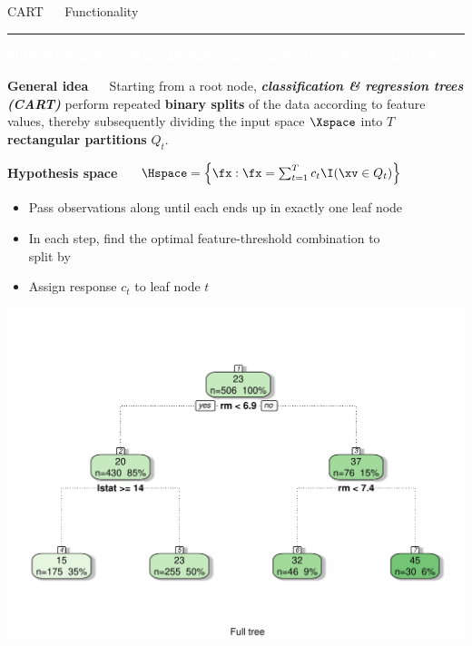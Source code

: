 \documentclass[11pt,compress,t,notes=noshow, xcolor=table]{beamer}
\begin{document}

\LARGE
\begin{frame}{\textcolor{gray!80}{CART} ~~ Functionality}
\normalsize
\vspace{-0.5cm}
\noindent \textcolor{gray!80}{\rule{\textwidth}{1pt}}

\vspace{0.3cm}

\footnotesize

\colorbox{gray!80}{\textcolor{white}{SUPERVISED}} 
\colorbox{gray!80}{\textcolor{white}{NON-PARAMETRIC}} 
\colorbox{gray!80}{\textcolor{white}{WHITE-BOX}} 
\colorbox{gray!80}{\textcolor{white}{FEATURE SELECTION}}

\medskip

\textbf{\textcolor{gray!80}{General idea}} ~~ Starting from a root node, 
\textit{\textbf{classification \& regression trees (CART)}} 
perform repeated \textbf{binary splits} of the data according to feature values, 
thereby subsequently dividing the input space $\Xspace$ into $T$ 
\textbf{rectangular partitions} $Q_t$.

\medskip
 
\textbf{\textcolor{gray!80}{Hypothesis space}} ~~
$\Hspace = \left\{ \fx: \fx = \sum_{t = 1}^T c_t \I(\xv \in Q_t) 
\right\}$

\medskip

\begin{minipage}{0.5\textwidth}
  \begin{itemize}
    \item Pass observations along until each ends up in exactly 
    one leaf node
    \item In each step, find the optimal feature-threshold
    combination to \\ split by
  \item Assign response $c_t$ to leaf node $t$
\end{itemize}

\end{minipage}%
\begin{minipage}{0.5\textwidth}
  \includegraphics[width=\textwidth]{figure/cart.pdf}
\end{minipage}

\end{frame}
\end{document}
